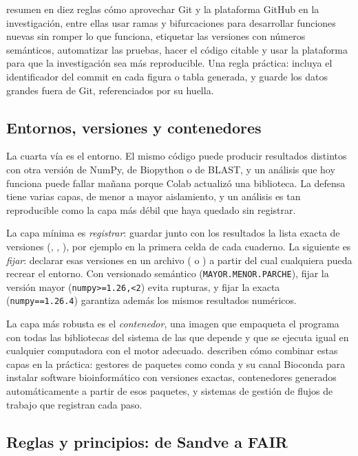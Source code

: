 \textcite{c00-perezriverol2016} resumen en diez reglas cómo aprovechar Git y la plataforma GitHub en la investigación, entre ellas usar ramas y bifurcaciones para desarrollar funciones nuevas sin romper lo que funciona, etiquetar las versiones con números semánticos, automatizar las pruebas, hacer el código citable y usar la plataforma para que la investigación sea más reproducible. Una regla práctica: incluya el identificador del commit en cada figura o tabla generada, y guarde los datos grandes fuera de Git, referenciados por su huella.

\subsection{Entornos, versiones y contenedores}

La cuarta vía es el entorno. El mismo código puede producir resultados distintos con otra versión de NumPy, de Biopython o de BLAST, y un análisis que hoy funciona puede fallar mañana porque Colab actualizó una biblioteca. La defensa tiene varias capas, de menor a mayor aislamiento, y un análisis es tan reproducible como la capa más débil que haya quedado sin registrar.


La capa mínima es \emph{registrar}: guardar junto con los resultados la lista exacta de versiones (, , ), por ejemplo en la primera celda de cada cuaderno. La siguiente es \emph{fijar}: declarar esas versiones en un archivo ( o ) a partir del cual cualquiera pueda recrear el entorno. Con versionado semántico (\texttt{MAYOR.MENOR.PARCHE}), fijar la versión mayor (\texttt{numpy>=1.26,<2}) evita rupturas, y fijar la exacta (\texttt{numpy==1.26.4}) garantiza además los mismos resultados numéricos.

La capa más robusta es el \emph{contenedor}, una imagen que empaqueta el programa con todas las bibliotecas del sistema de las que depende y que se ejecuta igual en cualquier computadora con el motor adecuado. \textcite{c00-gruning2018} describen cómo combinar estas capas en la práctica: gestores de paquetes como conda y su canal Bioconda para instalar software bioinformático con versiones exactas, contenedores generados automáticamente a partir de esos paquetes, y sistemas de gestión de flujos de trabajo que registran cada paso.


\subsection{Reglas y principios: de Sandve a FAIR}

